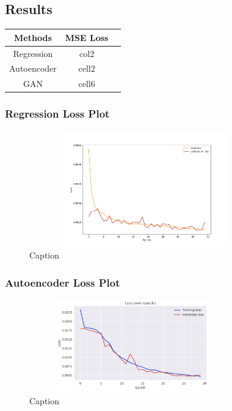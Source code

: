 \documentclass{article}
\begin{document}
\subsection{Results}

\begin{center}
\begin{tabular}{ |c |c|c| } 
\hline
\textbf{Methods} & \textbf{MSE Loss}\\
\hline
Regression & col2 \\
\hline
Autoencoder & cell2   \\ 
\hline
GAN & cell6  \\ 
\hline
\end{tabular}
\end{center}

\pagebreak

\subsubsection{Regression Loss Plot}

\begin{figure}[h]
\begin{center}
    \includegraphics[width=10cm, height=5cm]{regression-plot.jpg}
    \caption{Caption}
\end{center}
\end{figure}

\subsubsection{Autoencoder Loss Plot}

\begin{figure}[h]
\begin{center}
    \includegraphics[width=9cm, height=4cm]{encoder-decoder-plot.jpg}
    \caption{Caption}
\end{center}
\end{figure}
\end{document}
